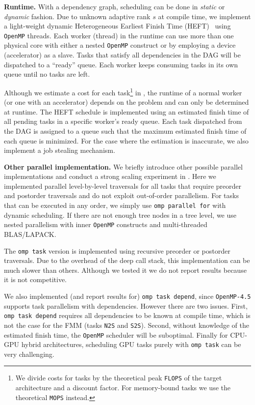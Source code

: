 \textbf{Runtime.}
With a dependency graph, scheduling can be done in 
\emph{static} or \emph{dynamic} fashion. 
Due to unknown adaptive rank $s$ at compile time, we implement a 
light-weight dynamic Heterogeneous Earliest Finish Time 
(HEFT)~\cite{topcuoglu2002performance} using \texttt{OpenMP} threads.
Each worker (thread) in the runtime can use more than one physical 
core with either  a nested \texttt{OpenMP} construct or by employing a device  (accelerator) as a slave.
Tasks that satisfy all dependencies in the DAG  will be 
dispatched to a ``ready'' queue. Each worker keeps 
consuming tasks in its own queue until no tasks are left.

Although we estimate a cost for each task\footnote{\scriptsize 
We divide costs for tasks by the theoretical peak 
\texttt{FLOPS} of the target architecture and a discount factor. 
For memory-bound tasks we use the theoretical \texttt{MOPS}
instead.} 
in , the runtime of a normal worker (or one with an accelerator) depends on the problem and can only be determined at runtime.
The HEFT schedule is implemented using an estimated finish time of all pending tasks in a specific worker's  ready queue. Each task dispatched from the DAG is assigned to a queue such that the maximum estimated finish time of each queue  is minimized. For the case where the estimation is inaccurate, we also implement
a job stealing mechanism. 

\textbf{Other parallel implementation.}
We briefly introduce other possible parallel implementations and conduct a strong scaling experiment in .
Here we implemented parallel level-by-level traversals for all tasks 
that require preorder and postorder traversals and do not exploit out-of-order parallelism. 
For tasks that can be executed in any order, we simply use 
\texttt{omp parallel for} with dynamic scheduling. 
If there are not enough tree nodes in a tree level, we use
nested parallelism with inner \texttt{OpenMP} constructs 
and multi-threaded BLAS/LAPACK.

The \texttt{omp task} version is implemented using recursive 
preorder or postorder traversals. Due to the overhead 
of the deep call stack, this implementation can be much slower than others. Although we tested it we do not report results because it is not competitive.

We also implemented (and report results for) \texttt{omp task depend}, since
\texttt{OpenMP-4.5} supports task parallelism with dependencies. However there
are two issues. First,
\texttt{omp task depend} requires all dependencies to be known at compile time,
which is not the case for the FMM (tasks \texttt{N2S} and \texttt{S2S}).
Second, without knowledge of the estimated finish time, the \texttt{OpenMP} scheduler will be suboptimal.  Finally for CPU-GPU hybrid architectures, scheduling GPU tasks purely with 
\texttt{omp task} can be very challenging. 

